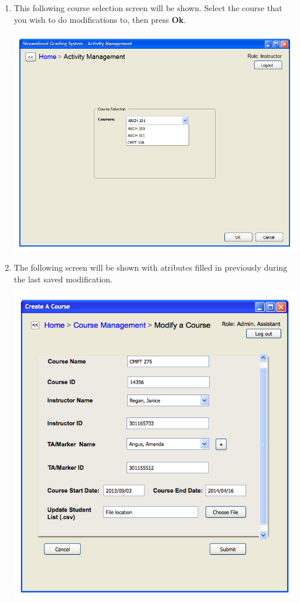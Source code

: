 \documentclass{article}
\begin{document}
\begin{enumerate}
	\item This following course selection screen will be shown.   Select the course that you wish
    to do modifications to, then press \textbf{Ok}.

    \begin{center} 
      \includegraphics[scale=0.55]{../images/UIMockups/pngs/CourseSelectionAM}
    \end{center}

	\item The following screen will be shown with  atributes filled in previously during the last saved modification. 


\includegraphics[scale=0.55]{../images/UIMockups/pngs/modifyACourse}



\end{enumerate}
\end{document}
